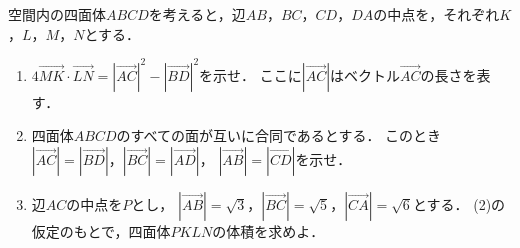 \documentclass[../../main.tex]{subfiles}
\begin{document}
空間内の四面体$ABCD$を考えると，辺$AB$，$BC$，$CD$，$DA$の中点を，それぞれ$K$，$L$，$M$，$N$とする．
\begin{enumerate}
  \item $4\overrightarrow{MK}\cdot\overrightarrow{LN}=|\overrightarrow{AC}|^2-|\overrightarrow{BD}|^2$を示せ．
    ここに$|\overrightarrow{AC}|$はベクトル$\overrightarrow{AC}$の長さを表す．
  \item 四面体$ABCD$のすべての面が互いに合同であるとする．
    このとき$|\overrightarrow{AC}|=|\overrightarrow{BD}|$，$|\overrightarrow{BC}|=|\overrightarrow{AD}|$，
    $|\overrightarrow{AB}|=|\overrightarrow{CD}|$を示せ．
  \item 辺$AC$の中点を$P$とし，
    $|\overrightarrow{AB}|=\sqrt{3}$，$|\overrightarrow{BC}|=\sqrt{5}$，$|\overrightarrow{CA}|=\sqrt{6}$とする．
    (2)の仮定のもとで，四面体$PKLN$の体積を求めよ．
\end{enumerate}
\end{document}
